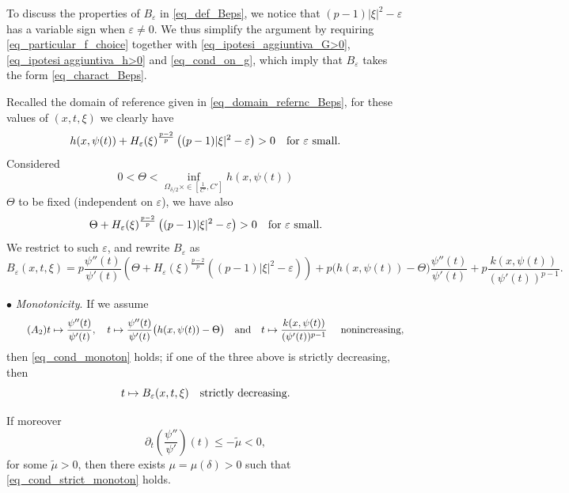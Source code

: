 \documentclass[11pt, reqno]{amsart}
\theoremstyle{definition}
\numberwithin{equation}{section}
\def\eps{\varepsilon}
\begin{document}
To discuss the properties of $B_{\eps}$ in \eqref{eq_def_Beps}, we notice that $ (p-1) |\xi|^2 - \eps $ has a variable sign when $\eps \neq 0$. 
We thus simplify the argument by requiring \eqref{eq_particular_f_choice} together with \eqref{eq_ipotesi_aggiuntiva_G>0}, \eqref{eq_ipotesi aggiuntiva_h>0} and \eqref{eq_cond_on_g}, which imply that $B_{\eps}$ takes the form \eqref{eq_charact_Beps}.

Recalled the domain of reference given in \eqref{eq_domain_refernc_Beps}, for these values of $(x,t,\xi)$ we clearly have
$$h(x, \psi(t)) + H_{\eps}(\xi)^{\frac{p-2}{p}} \left((p-1) |\xi|^2 - \eps\right) >0\quad \hbox{for $\eps$ small}.$$
Considered
\begin{equation}\label{eq_assump_Theta}
\tag{$A_1$}
0< \Theta < \inf_{\Omega_{\delta/2} \times \in [\tfrac{1}{C'},C'] } h(x,\psi(t))
 \end{equation}
$\Theta$ to be fixed (independent on $\eps$), we have also
$$ \Theta + H_{\eps}(\xi)^{\frac{p-2}{p}} \left((p-1) |\xi|^2 - \eps\right) >0 \quad \hbox{for $\eps$ small}.$$
We restrict to such $\eps$, and rewrite $B_{\eps}$ as
 $$B_{\eps}(x,t,\xi)=p \frac{\psi''(t)}{\psi'(t)} \left( \Theta + H_{\eps}(\xi)^{\frac{p-2}{p}} \left((p-1) |\xi|^2 - \eps \right) \right) + p \big(h(x,\psi(t))-\Theta\big) \frac{\psi''(t)}{\psi'(t)} + p \frac{k(x,\psi(t))}{(\psi'(t))^{p-1}}.$$
 
\medskip

$\bullet$ \emph{Monotonicity}. 
If we assume
\begin{equation}\label{eq_ipot_psi_monot}
\tag{$A_2$}
 t \mapsto \frac{\psi''(t)}{\psi'(t)}, \quad t \mapsto \frac{\psi''(t)}{\psi'(t)} \big(h(x,\psi(t))-\Theta \big) \quad \hbox{and} \quad t \mapsto \frac{k(x,\psi(t))}{(\psi'(t))^{p-1}}\quad \hbox{ nonincreasing},
\end{equation}
then \eqref{eq_cond_monoton} holds; 
if one of the three above is strictly decreasing, then
\begin{equation}\label{eq_cond_monoton_strict}
t \mapsto B_{\eps}(x,t,\xi) \quad \hbox{strictly decreasing}. 
\end{equation}

If moreover
\begin{equation}\label{eq_ipot_psi_mustrett}
\tag{$A_3$}
\partial_t \left (\frac{\psi''}{\psi'}\right)(t) \leq - \tilde{\mu}<0, 
\end{equation}
for some $\tilde{\mu}>0$, then
there exists $\mu=\mu(\delta)>0$ such that \eqref{eq_cond_strict_monoton} holds.
\end{document}
